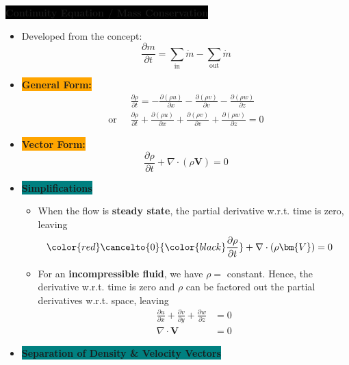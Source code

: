 \colorbox{black}{\textbf{\color{white}Continuity Equation / Mass Conservation}}
\begin{itemize}
    \item Developed from the concept: 
    \begin{equation*}
        \frac{\partial m}{\partial t}= \sum_{\text{in}}\dot{m} - \sum_{\text{out}}\dot{m}
    \end{equation*}
    \item \colorbox{orange}{\textbf{\color{white}General Form:}}
    \begin{align*}
        &\frac{\partial \rho}{\partial t} = - \frac{\partial (\rho u)}{\partial x} - \frac{\partial (\rho v)}{\partial v} - \frac{\partial (\rho w)}{\partial z} \\
        \text{or }\; &\frac{\partial \rho}{\partial t} + \frac{\partial (\rho u)}{\partial x} + \frac{\partial (\rho v)}{\partial v} + \frac{\partial (\rho w)}{\partial z} = 0
    \end{align*}
    \item \colorbox{orange}{\textbf{\color{white}Vector Form:}}
    \begin{equation*}
        \frac{\partial \rho}{\partial t} + \nabla \cdot (\rho \bm{V}) = 0
    \end{equation*}
    \item \colorbox{teal}{\textbf{\color{white}Simplifications}}
    \begin{itemize}
        \item When the flow is \textbf{\color{red}steady state}, the partial derivative w.r.t. time is zero, leaving
        \begin{align*}
            {\color{red}\cancelto{0}{\color{black}\frac{\partial \rho}{\partial t}}} + \nabla \cdot (\rho \bm{V}) &= 0
        \end{align*}
        \item For an \textbf{\color{purple}incompressible fluid}, we have $\rho =$ constant. Hence, the derivative w.r.t. time is zero and $\rho$ can be factored out the partial derivatives w.r.t. space, leaving
        \begin{align*}
            \frac{\partial u}{\partial x} + \frac{\partial  v}{\partial y} + \frac{\partial w}{\partial z} &= 0 \\
            \nabla \cdot \bm{V} &= 0
        \end{align*}
    \end{itemize}
    \item \colorbox{teal}{\textbf{\color{white}Separation of Density \& Velocity Vectors}}

\end{itemize}
